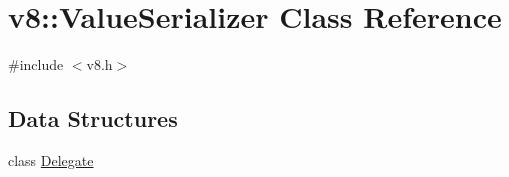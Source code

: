 \hypertarget{classv8_1_1ValueSerializer}{}\section{v8\+:\+:Value\+Serializer Class Reference}
\label{classv8_1_1ValueSerializer}


{\ttfamily \#include $<$v8.\+h$>$}

\subsection*{Data Structures}
\begin{DoxyCompactItemize}
\item 
class \mbox{\hyperlink{classv8_1_1ValueSerializer_1_1Delegate}{Delegate}}
\end{DoxyCompactItemize}
